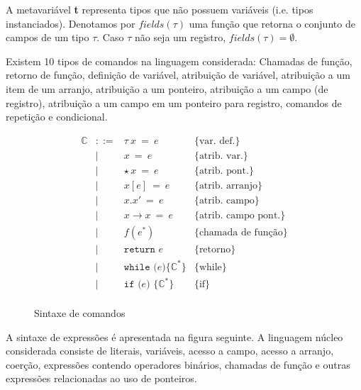 \documentclass[a4paper,8pt]{article}
\begin{document}
     A metavariável \textbf{t} representa tipos que não possuem
     variáveis (i.e. tipos instanciados). Denotamos por $fields(\tau)$
     uma função que retorna o conjunto de campos de um tipo
     $\tau$. Caso $\tau$ não seja um registro, $fields(\tau) = \emptyset$.
     
     Existem 10 tipos de comandos na linguagem considerada: Chamadas de
     função, retorno de função, definição de variável, atribuição de
     variável, atribuição a um item de um arranjo, atribuição a um
     ponteiro, atribuição a um campo (de registro), atribuição a um
     campo em um ponteiro para registro, comandos de repetição e condicional.

     \begin{figure}[h]
       \[
         \begin{array}{lcll}
           \mathbb{C} & ::=   & \tau\:x\:=\:e & \{\text{var. def.}\} \\
             & \mid & x\:=\:e & \{\text{atrib. var.}\} \\
             & \mid & \star\,x\:=\:e & \{\text{atrib. pont.}\} \\
             & \mid & x[e]\:=\:e &\{\text{atrib. arranjo}\} \\
             & \mid & x.x'\: = \: e & \{\text{atrib. campo}\} \\
             & \mid & x\to x\: = \: e & \{\text{atrib. campo pont.}\}\\
             & \mid & f(e^*) & \{\text{chamada de função}\} \\
             & \mid & \texttt{return }e & \{\text{retorno}\} \\
             & \mid & \texttt{while (}e \texttt{)\{} \mathbb{C}^*
                      \texttt{\}} & \{\text{while}\} \\
             & \mid & \texttt{if (} e \texttt{) \{}\mathbb{C}^*
                      \texttt{\}} & \{\text{if}\} \\
         \end{array} \]
       \centering
       \caption{Sintaxe de comandos}
       \label{figcmdsyn}
    \end{figure}

    A sintaxe de expressões é apresentada na figura seguinte. A
    linguagem núcleo considerada consiste de literais, variáveis,
    acesso a campo, acesso a arranjo, coerção, expressões contendo
    operadores binários, chamadas de função e outras expressões
    relacionadas ao uso de ponteiros.
\end{document}
